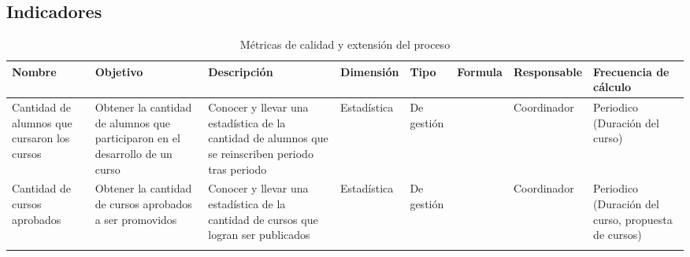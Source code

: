 \subsection{Indicadores}
\begin{longtable}{|p{1.3cm}|p{1.4cm}|p{2cm}|p{2cm}|p{.8cm}|p{1.3cm}|p{2.2cm}|p{2cm}|}%
		\hline
			\footnotesize\textbf{Nombre} & 
			\footnotesize\textbf{Objetivo} & 
			\footnotesize\textbf{Descripción} & 
			\footnotesize\textbf{Dimensión} & 
			\footnotesize\textbf{Tipo} & 
			\footnotesize\textbf{Formula} & 
			\footnotesize\textbf{Responsable} & 
			\footnotesize\textbf{Frecuencia de cálculo}\\
		\hline\hline%
			\footnotesize{Cantidad de alumnos que cursaron los cursos} & 
			\footnotesize{Obtener la cantidad de alumnos que participaron en el desarrollo de un curso} & 
			\footnotesize{Conocer y llevar una estadística de la cantidad de alumnos que se reinscriben periodo tras periodo} & 
			\footnotesize{Estadística} & 
			\footnotesize{De gestión} & 
			\footnotesize{%
			} & 
			\footnotesize{Coordinador} & 
			\footnotesize{Periodico (Duración del curso)}\\
		\hline\hline%
			\footnotesize{Cantidad de cursos aprobados} & 
			\footnotesize{Obtener la cantidad de cursos aprobados a ser promovidos} & 
			\footnotesize{Conocer y llevar una estadística de la cantidad de cursos que logran ser publicados} & 
			\footnotesize{Estadística} & 
			\footnotesize{De gestión} & 
			\footnotesize{%
			} & 
			\footnotesize{Coordinador} & 
			\footnotesize{Periodico (Duración del curso, propuesta de cursos)}\\
		\hline
\caption{Métricas de calidad y extensión del proceso}
\end{longtable}

